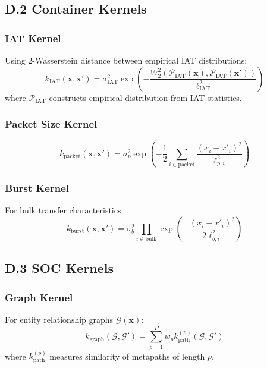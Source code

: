 \documentclass[12pt]{article}
\begin{document}
\subsection{D.2 Container Kernels}

\subsubsection{IAT Kernel}
Using 2-Wasserstein distance between empirical IAT distributions:
\begin{equation}
k_{\text{IAT}}(\mathbf{x}, \mathbf{x'}) = \sigma_{\text{IAT}}^2 \exp\left(-\frac{W_2^2(\mathcal{P}_{\text{IAT}}(\mathbf{x}), \mathcal{P}_{\text{IAT}}(\mathbf{x'}))}{\ell_{\text{IAT}}^2}\right)
\end{equation}
where $\mathcal{P}_{\text{IAT}}$ constructs empirical distribution from IAT statistics.

\subsubsection{Packet Size Kernel}
\begin{equation}
k_{\text{packet}}(\mathbf{x}, \mathbf{x'}) = \sigma_p^2 \exp\left(-\frac{1}{2}\sum_{i \in \text{packet}} \frac{(x_i - x'_i)^2}{\ell_{p,i}^2}\right)
\end{equation}

\subsubsection{Burst Kernel}
For bulk transfer characteristics:
\begin{equation}
k_{\text{burst}}(\mathbf{x}, \mathbf{x'}) = \sigma_b^2 \prod_{i \in \text{bulk}} \exp\left(-\frac{(x_i - x'_i)^2}{2\ell_{b,i}^2}\right)
\end{equation}

\subsection{D.3 SOC Kernels}

\subsubsection{Graph Kernel}
For entity relationship graphs $\mathcal{G}(\mathbf{x})$:
\begin{equation}
k_{\text{graph}}(\mathcal{G}, \mathcal{G'}) = \sum_{p=1}^P w_p k_{\text{path}}^{(p)}(\mathcal{G}, \mathcal{G'})
\end{equation}
where $k_{\text{path}}^{(p)}$ measures similarity of metapaths of length $p$.
\end{document}
